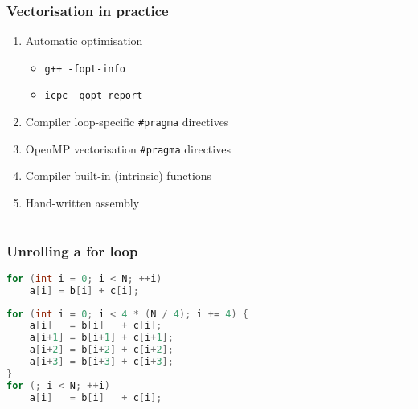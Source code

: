 \documentclass[14pt,aspectratio=169,dvipsnames,table]{beamer}
\begin{document}
\begin{frame}[fragile]
  \frametitle{Vectorisation in practice}
  \begin{enumerate}[itemsep=8pt]
  \item Automatic optimisation
    \begin{itemize}[wide=0pt,itemsep=4pt,topsep=4pt]
    \item \parbox{8.35cm}{\texttt{g++ -fopt-info}}
      \href{https://gcc.gnu.org/onlinedocs/gcc/Developer-Options.html}
      {\faQuestionCircle}
    \item \parbox{8.35cm}{\texttt{icpc -qopt-report}}
      \href{https://www.intel.com/content/www/us/en/develop/documentation/cpp-compiler-developer-guide-and-reference/top/compiler-reference/compiler-options/compiler-option-details/optimization-report-options/qopt-report-qopt-report.html#qopt-report-qopt-report}
      {\faQuestionCircle}
    \end{itemize}

  \item Compiler loop-specific \texttt{\#pragma} directives\footnotemark{}

  \item OpenMP\footnotemark{} vectorisation \texttt{\#pragma} directives

  \item \parbox{9cm}{Compiler built-in (intrinsic) functions}
    \href{https://gcc.gnu.org/onlinedocs/gcc-4.9.4/gcc/X86-Built-in-Functions.html#X86-Built-in-Functions}{\faQuestionCircle}

  \item Hand-written assembly

  \end{enumerate}

  \vspace{15pt}

  \hrule

  \vskip 5pt

  \footnotemark[1]

  \footnotemark[2]

\end{frame}





\begin{frame}[fragile]
  \frametitle{Unrolling a for loop}
\begin{lstlisting}[language=C]
for (int i = 0; i < N; ++i)
    a[i] = b[i] + c[i];
\end{lstlisting}

  \pause

\begin{lstlisting}[language=C]
for (int i = 0; i < 4 * (N / 4); i += 4) {
    a[i]   = b[i]   + c[i];
    a[i+1] = b[i+1] + c[i+1];
    a[i+2] = b[i+2] + c[i+2];
    a[i+3] = b[i+3] + c[i+3];
}
for (; i < N; ++i)
    a[i]   = b[i]   + c[i];
\end{lstlisting}

\end{frame}
\end{document}
